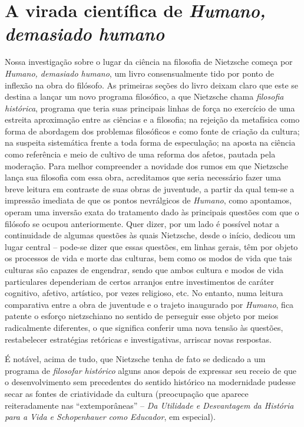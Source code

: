 \documentclass[
	12pt,				%
	openright,			%
	oneside,			%
	a4paper,			%
	english,			%
	french,				%
	spanish,			%
	brazil				%
	]{abntex2}
\newcommand{\Hum}{\textit{Humano}\xspace}
\begin{document}
\chapter{A virada científica de \textit{Humano, demasiado humano}}
\label{cap1}


Nossa investigação sobre o lugar da ciência na filosofia de Nietzsche começa por \textit{Humano, demasiado humano}, um livro consensualmente tido por ponto de inflexão na obra do filósofo. As primeiras seções do livro deixam claro que este se destina a lançar um novo programa filosófico, a que Nietzsche chama \textit{filosofia histórica}, programa que teria suas principais linhas de força no exercício de uma estreita aproximação entre as ciências e a filosofia; na rejeição da metafísica como forma de abordagem dos problemas filosóficos e como fonte de criação da cultura; na suspeita sistemática frente a toda forma de especulação; na aposta na ciência como referência e meio de cultivo de uma reforma dos afetos, pautada pela moderação. Para melhor compreender a novidade dos rumos em que Nietzsche lança sua filosofia com essa obra, acreditamos que seria necessário fazer uma breve leitura em contraste de suas obras de juventude, a partir da qual tem-se a impressão imediata de que os pontos nevrálgicos de \Hum, como apontamos, operam uma inversão exata do tratamento dado às principais questões com que o filósofo se ocupou anteriormente. Quer dizer, por um lado é possível notar a continuidade de algumas questões às quais Nietzsche, desde o início, dedicou um lugar central – pode-se dizer que essas questões, em linhas gerais, têm por objeto os processos de vida e morte das culturas, bem como os modos de vida que tais culturas são capazes de engendrar, sendo que ambos cultura e modos de vida particulares dependeriam de certos arranjos entre investimentos de caráter cognitivo, afetivo, artístico, por vezes religioso, etc. No entanto, numa leitura comparativa entre a obra de juventude e o trajeto inaugurado por \Hum, fica patente o esforço nietzschiano no sentido de perseguir esse objeto por meios radicalmente diferentes, o que significa conferir uma nova tensão às questões, restabelecer estratégias retóricas e investigativas, arriscar novas respostas.

	É notável, acima de tudo, que Nietzsche tenha de fato se dedicado a um programa de \textit{filosofar histórico} alguns anos depois de expressar seu receio de que o desenvolvimento sem precedentes do sentido histórico na modernidade pudesse secar as fontes de criatividade da cultura (preocupação que aparece reiteradamente nas “extemporâneas” – \textit{Da Utilidade e Desvantagem da História para a Vida e Schopenhauer como Educador}, em especial).
\end{document}
